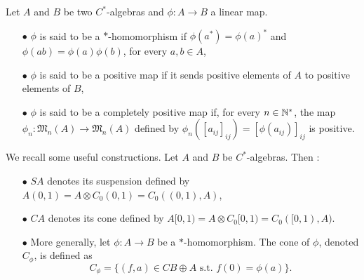 
\begin{definition} Let $A$ and $B$ be two $C^*$-algebras and $\phi : A\rightarrow B$ a linear map.
\begin{itemize}
\item[$\bullet$] $\phi$ is said to be a $*$-homomorphism if $\phi(a^*)=\phi(a)^*$ and $\phi(ab) = \phi(a)\phi(b)$, for every $a,b\in A$,
\item[$\bullet$] $\phi$ is said to be a positive map if it sends positive elements of $A$ to positive elements of $B$, 
\item[$\bullet$] $\phi$ is said to be a completely positive map if, for every $n\in \mathbb N^*$, the map $\phi_n : \mathfrak M_n(A) \rightarrow \mathfrak M_n(A) $ defined by $\phi_n([a_{ij}]_{ij})= [\phi(a_{ij})]_{ij}$ is positive.
\end{itemize}
\end{definition}

We recall some useful constructions. Let $A$ and $B$ be $C^*$-algebras. Then : 

\begin{itemize}
\item[$\bullet$] $SA$ denotes its suspension defined by $A(0,1) = A\otimes C_0(0,1) = C_0((0,1),A)$,
\item[$\bullet$] $CA$ denotes its cone defined by $A[0,1) = A\otimes C_0[0,1) = C_0([0,1),A)$.
\item[$\bullet$] More generally, let $\phi : A \rightarrow B$ be a $*$-homomorphism. The cone of $\phi$, denoted $C_\phi$, is defined as 
\[C_\phi = \{(f,a)\in CB\oplus A \text{ s.t. } f(0) = \phi(a)\}.\] 
\end{itemize}
